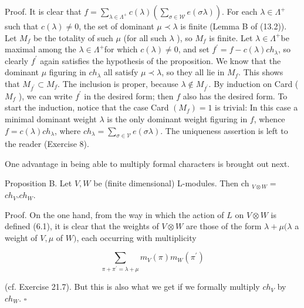 \documentclass[10pt]{article}
\begin{document}
Proof. It is clear that $f=\sum_{\lambda \in \Lambda^{+}} c(\lambda)\left(\sum_{\sigma \in \mathscr{W}} e(\sigma \lambda)\right)$. For each $\lambda \in \Lambda^{+}$such that $c(\lambda) \neq 0$, the set of dominant $\mu \prec \lambda$ is finite (Lemma B of (13.2)). Let $M_{f}$ be the totality of such $\mu$ (for all such $\lambda$ ), so $M_{f}$ is finite. Let $\lambda \in \Lambda^{+}$be maximal among the $\lambda \in \Lambda^{+}$for which $c(\lambda) \neq 0$, and set $f^{\prime}=f-c(\lambda) c h_{\lambda}$, so clearly $f^{\prime}$ again satisfies the hypothesis of the proposition. We know that the dominant $\mu$ figuring in $c h_{\lambda}$ all satisfy $\mu \prec \lambda$, so they all lie in $M_{f}$. This shows that $M_{f^{\prime}} \subset M_{f}$. The inclusion is proper, because $\lambda \notin M_{f^{\prime}}$. By induction on Card ( $M_{f}$ ), we can write $f^{\prime}$ in the desired form; then $f$ also has the desired form. To start the induction, notice that the case Card $\left(M_{f}\right)=1$ is trivial: In this case a minimal dominant weight $\lambda$ is the only dominant weight figuring in $f$, whence $f=c(\lambda) c h_{\lambda}$, where $c h_{\lambda}=\sum_{\sigma \in \mathscr{V}} e(\sigma \lambda)$. The uniqueness assertion is left to the reader (Exercise 8).

One advantage in being able to multiply formal characters is brought out next.

Proposition B. Let $V, W$ be (finite dimensional) L-modules. Then ch $_{V \otimes W}=$ $c h_{V} . c h_{W}$.

Proof. On the one hand, from the way in which the action of $L$ on $V \otimes W$ is defined (6.1), it is clear that the weights of $V \otimes W$ are those of the form $\lambda+\mu(\lambda$ a weight of $V, \mu$ of $W)$, each occurring with multiplicity

$$
\sum_{\pi+\pi^{\prime}=\lambda+\mu} m_{V}(\pi) m_{W}\left(\pi^{\prime}\right)
$$

(cf. Exercise 21.7). But this is also what we get if we formally multiply $c h_{V}$ by $c h_{W}$. $\square$
\end{document}
